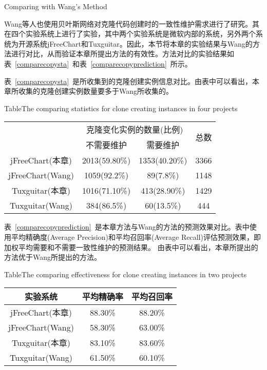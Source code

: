 {Comparing with Wang’s Method}

Wang\cite{wang2014predicting}等人也使用贝叶斯网络对克隆代码创建时的一致性维护需求进行了研究。其在四个实验系统上进行了实验，其中两个实验系统是微软内部的系统，另外两个系统为开源系统jFreeChart和Tuxguitar。因此，本节将本章的实验结果与Wang的方法进行对比，从而验证本章所提出方法的有效性。方法对比的实验结果如表~\ref{comparecopysta}~和表~\ref{comparecopyprediction}~所示。

表~\ref{comparecopysta}~是所收集到的克隆创建实例信息对比。由表中可以看出，本章所收集的克隆创建实例数量要多于Wang所收集的。

\begin{table}[htbp]
{Table$\!$}{The comparing statistics for clone creating instances in four projects}
\vspace{0.5em}
\centering
\wuhao
\begin{tabular}{cccc}
\toprule[1.5pt]
~\multirow{2}{*}{实验系统}& \multicolumn{2}{c}{克隆变化实例的数量(比例)} & \multirow{2}{*}{总数}\\ 
 \cline{2-3}
~&{不需要维护} &{需要维护} & ~\\
\midrule[1pt]
jFreeChart(本章)&	2013(59.80\%)&	1353(40.20\%)&	3366\\
jFreeChart(Wang)&1059(92.2\%)&	89(7.8\%)&	1148\\
Tuxguitar(本章)&	1016(71.10\%)&	413(28.90\%)&	1429\\
Tuxguitar(Wang)&384(86.5\%)&	60(13.5\%)&	444\\
\bottomrule[1.5pt]
\end{tabular}
\end{table}

表~\ref{comparecopyprediction}~是本章方法与Wang的方法的预测效果对比。表中使用平均精确度(Average Precision)和平均召回率(Average Recall)评估预测效果，即加权平均需要和不需要一致性维护的预测结果。
由表中可以看出，本章所提出的方法优于Wang所提出的方法。

\begin{table}[htbp]
{Table$\!$}{The comparing effectiveness for clone creating instances in two projects}
\vspace{0.5em}
\centering
\wuhao
\begin{tabular}{ccc}
\toprule[1.5pt]
{实验系统}&{平均精确率} &{平均召回率}\\ 
\midrule[1pt]
jFreeChart(本章)&	88.30\%& 88.20\%\\
jFreeChart(Wang)&58.30\%&	63.00\%\\
Tuxguitar(本章)&	83.10\%&	83.60\%\\
Tuxguitar(Wang)&61.50\%&	60.10\%\\
\bottomrule[1.5pt]
\end{tabular}
\end{table}

